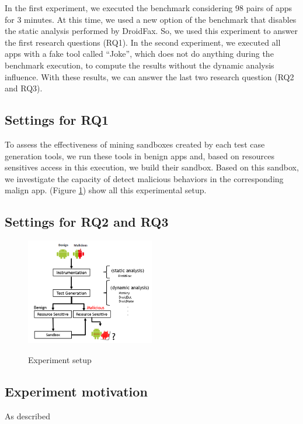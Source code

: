 In the first experiment, we executed the benchmark considering 98 pairs of apps for 3 minutes. At this time, we used a new option of the benchmark that disables the static analysis performed by DroidFax. So, we used this experiment to answer the first research questions (RQ1). In the second experiment, we executed all apps with a fake tool called “Joke”, which does not do anything during the benchmark execution, to compute the results without the dynamic analysis influence. With these results, we can answer the last two research question (RQ2 and RQ3).

\subsection{Settings for RQ1}

To assess the effectiveness of mining sandboxes created by each test case generation tools, we run these tools in benign apps and, based on resources sensitives access in this execution, we build their sandbox. Based on this sandbox, we investigate the capacity of detect malicious behaviors in the corresponding malign app. (Figure  \ref{fig:setup}) show all this experimental setup.


\subsection{Settings for RQ2 and RQ3}


\begin{figure}[h!]
  \includegraphics[width=0.5\textwidth]{images/setup.png}
  \label{Experiment setup}
  \caption{Experiment setup}
  \label{fig:setup}
\end{figure}


\subsection{Experiment motivation}

As described 

